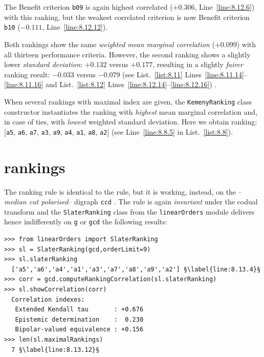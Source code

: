 The Benefit criterion \texttt{b09} is again highest correlated ($+0.306$, Line~\ref{line:8.12.6}) with this \Kemeny ranking, but the weakest correlated criterion is now Benefit criterion \texttt{b10} ($-0.111$, Line~\ref{line:8.12.12}).

Both \Kemeny rankings show the same \emph{weighted mean marginal correlation} ($+0.099$) with all thirteen performance criteria. However, the second ranking shows a slightly lower \emph{standard deviation}: $+0.132$ versus $+0.177$, resulting in a slightly \emph{fairer} ranking result: $-0.033$ versus $-0.079$ (see List.~\vref{list:8.11} Lines~\ref{line:8.11.14}--\ref{line:8.11.16} and List.~\ref{list:8.12} Lines~\ref{line:8.12.14}--\ref{line:8.12.16}) .

When several rankings with maximal \Kemeny index are given, the \texttt{Kemeny\-Ranking} class constructor instantiates the ranking with \emph{highest} mean marginal correlation and, in case of ties, with \emph{lowest} weighted standard deviation. Here we obtain ranking: [\texttt{a5}, \texttt{a6}, \texttt{a7}, \texttt{a3}, \texttt{a9}, \texttt{a4}, \texttt{a1}, \texttt{a8}, \texttt{a2}] (see Line~\ref{line:8.8.5} in List.~\vref{list:8.8}).

\section{\Slater rankings}
\label{sec:8.5}

The \Slater ranking rule is identical to the \Kemeny rule, but it is working, instead, on the \Condorcet --\emph{median cut polarised}-- digraph \texttt{ccd} \citep{SLA-1961}. The \Slater rule is again \emph{invariant} under the codual transform and the \texttt{SlaterRanking} class from the \texttt{linearOrders} module delivers hence indifferently on \texttt{g} or \texttt{gcd} the following results:
\begin{lstlisting}[caption={Computing a \Slater ranking},label=list:8.13]   
>>> from linearOrders import SlaterRanking
>>> sl = SlaterRanking(gcd,orderLimit=9)
>>> sl.slaterRanking
  ['a5','a6','a4','a1','a3','a7','a8','a9','a2'] §\label{line:8.13.4}§
>>> corr = gcd.computeRankingCorrelation(sl.slaterRanking)
>>> sl.showCorrelation(corr)
  Correlation indexes:
   Extended Kendall tau       : +0.676
   Epistemic determination    :  0.230
   Bipolar-valued equivalence : +0.156
>>> len(sl.maximalRankings)
  7 §\label{line:8.13.12}§
\end{lstlisting}

